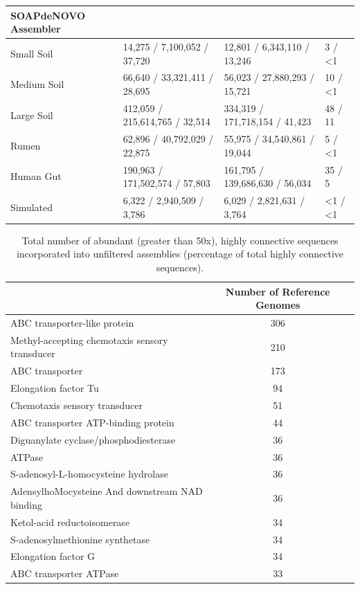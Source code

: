 \documentclass[10pt]{article}
\begin{document}
\begin{landscape}
\begin{table}[ht]
\begin{tabular}{*{4}{p{5cm}}}
\end{tabular}
\begin{tabular}{*{4}{p{5cm}}}
\hline
SOAPdeNOVO Assembler  \\ 
\hline
Small Soil		&14,275 / 7,100,052 / 37,720	&12,801 / 6,343,110 / 13,246		&3 / \textless1\\
Medium Soil	&66,640 / 33,321,411 / 28,695	&56,023 / 27,880,293 / 15,721		&10 / \textless1\\
Large Soil		&412,059 / 215,614,765 / 32,514	&334,319 /  171,718,154 / 41,423	&48 / 11\\
Rumen		&62,896 / 40,792,029 / 22,875		&55,975 / 34,540,861 / 19,044	&5 / \textless 1\\
Human Gut	&190,963 / 171,502,574 / 57,803	&161,795 / 139,686,630 / 56,034	&35 / 5\\
Simulated		&6,322 / 2,940,509 / 3,786		&6,029 / 2,821,631 / 3,764	&\textless1 / \textless1\\
\end{tabular}
\end{table}
\end{landscape}


\begin{table}
\caption{Total number of abundant (greater than 50x), highly connective sequences incorporated into unfiltered assemblies (percentage of total highly connective sequences).}
\begin{tabular}{lc c}
\hline
& Number of Reference Genomes\\
\hline
ABC transporter-like protein	&306\\
Methyl-accepting chemotaxis sensory transducer	&210\\
ABC transporter	&173\\
Elongation factor Tu	&94\\
Chemotaxis sensory transducer	&51\\
ABC transporter ATP-binding protein	&44\\
Diguanylate cyclase/phosphodiesterase	&36\\
ATPase	&36\\
S-adenosyl-L-homocysteine hydrolase	&36\\
AdensylhoMocysteine And downstream NAD binding	&36\\
Ketol-acid reductoisomerase	&34\\
S-adenosylmethionine synthetase	&34\\
Elongation factor G	&34\\
ABC transporter ATPase	&33\\
\end{tabular}
\end{table}
\end{document}
